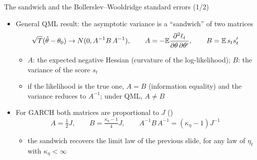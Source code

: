 \begin{frame}{The sandwich and the Bollerslev--Wooldridge standard errors (1/2)}
\itemsize{\small}
\begin{itemize}
    \item General QML result: the asymptotic variance is a ``sandwich'' of two matrices
    \[ \sqrt T(\hat\theta - \theta_0) \to N(0, A^{-1}B\,A^{-1}), \qquad A = -\mathbb{E}\frac{\partial^2\ell_t}{\partial\theta\,\partial\theta'}, \qquad B = \mathbb{E}\,s_ts_t' \]
    \begin{itemize}
        \item $A$: the expected negative Hessian (curvature of the log-likelihood); $B$: the variance of the score $s_t$
        \item if the likelihood is the true one, $A = B$ (information equality) and the variance reduces to $A^{-1}$; under QML, $A \ne B$
    \end{itemize}
    \item For GARCH both matrices are proportional to $J$ ()
    \[ A = \tfrac12J, \qquad B = \tfrac{\kappa_\eta - 1}{4}J, \qquad A^{-1}B\,A^{-1} = (\kappa_\eta - 1)J^{-1} \]
    \begin{itemize}
        \item the sandwich recovers the limit law of the previous slide, for any law of $\eta_t$ with $\kappa_\eta < \infty$
    \end{itemize}
\end{itemize}
\end{frame}

